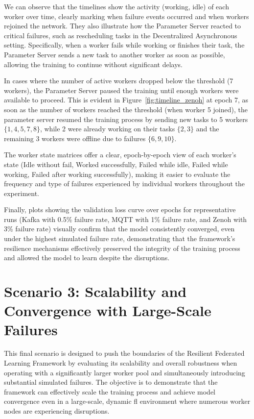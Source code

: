 We can observe that the timelines show the activity (working, idle) of each worker over time, clearly marking when failure events occurred and when workers rejoined the network. They also illustrate how the Parameter Server reacted to critical failures, such as rescheduling tasks in the Decentralized Asynchronous setting. Specifically, when a worker fails while working or finishes their task, the Parameter Server sends a new task to another worker as soon as possible, allowing the training to continue without significant delays.

In cases where the number of active workers dropped below the threshold (7 workers), the Parameter Server paused the training until enough workers were available to proceed. This is evident in Figure~\ref{fig:timeline_zenoh} at epoch 7, as soon as the number of workers reached the threshold (when worker 5 joined), the parameter server resumed the training process by sending new tasks to 5 workers $\{1, 4, 5, 7, 8\}$, while 2 were already working on their tasks $\{2, 3\}$ and the remaining 3 workers were offline due to failures $\{6, 9, 10\}$.

The worker state matrices offer a clear, epoch-by-epoch view of each worker's state (Idle without fail, Worked successfully, Failed while idle, Failed while working, Failed after working successfully), making it easier to evaluate the frequency and type of failures experienced by individual workers throughout the experiment. 

Finally, plots showing the validation loss curve over epochs for representative runs (Kafka with 0.5\% failure rate, MQTT with 1\% failure rate, and Zenoh with 3\% failure rate) visually confirm that the model consistently converged, even under the highest simulated failure rate, demonstrating that the framework's resilience mechanisms effectively preserved the integrity of the training process and allowed the model to learn despite the disruptions.



\section{Scenario 3: Scalability and Convergence with Large-Scale Failures}
\label{sec:scenario-3}

This final scenario is designed to push the boundaries of the Resilient Federated Learning Framework by evaluating its scalability and overall robustness when operating with a significantly larger worker pool and simultaneously introducing substantial simulated failures. The objective is to demonstrate that the framework can effectively scale the training process and achieve model convergence even in a large-scale, dynamic \ac{fl} environment where numerous worker nodes are experiencing disruptions.

